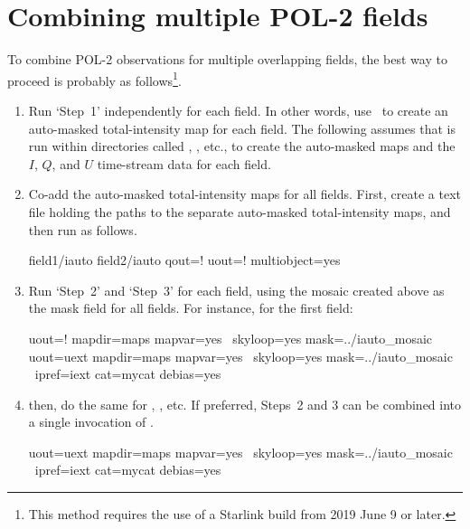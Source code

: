 \section{Combining multiple POL-2 fields}

To combine POL-2 observations for multiple overlapping fields, the best way to
proceed is probably as follows\footnote{This method requires the use of a
Starlink build from 2019 June 9 or later.}.

\begin{enumerate}
\item Run `Step~1' independently for each field. In other words, use \poltwomap\ to create an
auto-masked total-intensity map for each field. The following assumes that  is run
within directories called , , etc., to create the auto-masked maps
and the $I$, $Q$, and $U$ time-stream data for each field.

\item Co-add the auto-masked total-intensity maps for all fields. First, create a text file holding
the paths to the separate auto-masked total-intensity maps, and then run  as
follows.

\begin{terminalv}
        field1/iauto
        field2/iauto
                  qout=! uout=! multiobject=yes
\end{terminalv}

\item Run `Step~2' and `Step~3' for each field, using the mosaic created above as the mask field 
for all fields. For instance, for the first field:

\begin{terminalv}
                  uout=! mapdir=maps mapvar=yes \
                  skyloop=yes mask=../iauto_mosaic 
                  uout=uext mapdir=maps mapvar=yes \
                  skyloop=yes mask=../iauto_mosaic \
                  ipref=iext cat=mycat debias=yes
\end{terminalv}

\item then, do the same for \file{field2}, , etc. If preferred, Steps~2 and 3 can be 
combined into a single invocation of .

\begin{terminalv}
                  uout=uext mapdir=maps mapvar=yes \
                  skyloop=yes mask=../iauto_mosaic \
                  ipref=iext cat=mycat debias=yes
\end{terminalv}


\end{enumerate}
